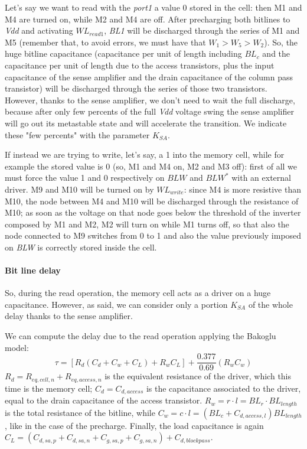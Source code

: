 Let's say we want to read with the \textit{port1} a value 0 stored in the cell: then M1 and M4 are turned on, while M2 and M4 are off. After precharging both bitlines to \textit{Vdd} and activating $WL_{read1}$, \textit{BL1} will be discharged through the series of M1 and M5 (remember that, to avoid errors, we must have that $W_1>W_5>W_2$). So, the huge bitline capacitance (capacitance per unit of length including $BL_c$ and the capacitance per unit of length due to the access transistors, plus the input capacitance of the sense amplifier and the drain capacitance of the column pass transistor) will be discharged through the series of those two transistors. However, thanks to the sense amplifier, we don't need to wait the full discharge, because after only few percents of the full \textit{Vdd} voltage swing the sense amplifier will go out its metastable state and will accelerate the transition. We indicate these "few percents" with the parameter $K_{SA}$. 

If instead we are trying to write, let's say, a 1 into the memory cell, while for example the stored value is 0 (so, M1 and M4 on, M2 and M3 off): first of all we must force the value 1 and 0 respectively on $BLW$ and $BLW^*$ with an external driver. M9 and M10 will be turned on by $WL_{write}$: since M4 is more resistive than M10, the node between M4 and M10 will be discharged through the resistance of M10; as soon as the voltage on that node goes below the threshold of the inverter composed by M1 and M2, M2 will turn on while M1 turns off, so that also the node connected to M9 switches from 0 to 1 and also the value previously imposed on \textit{BLW} is correctly stored inside the cell. 

\paragraph{Bit line delay} 
\label{sec:bitline_delay}
So, during the read operation, the memory cell acts as a driver on a huge capacitance. However, as said, we can consider only a portion $K_{SA}$ of the whole delay thanks to the sense amplifier. 

We can compute the delay due to the read operation applying the Bakoglu model:
$$\tau=[R_d(C_d+C_w+C_L)+R_wC_L]+\frac{0.377}{0.69}(R_wC_w)$$
$R_d=R_{eq,cell,n}+R_{eq,access,n}$ is the equivalent resistance of the driver, which this time is the memory cell; $C_d=C_{d,access}$ is the capacitance associated to the driver, equal to the drain capacitance of the access transistor. $R_w=r\cdot l=BL_{r}\cdot BL_{length}$ is the total resistance of the bitline, while $C_w=c\cdot l=(BL_{c}+C_{d,access,l})BL_{length}$, like in the case of the precharge. Finally, the load capacitance is again $C_L=(C_{d,sa,p}+C_{d,sa,n}+C_{g,sa,p}+C_{g,sa,n})+C_{d,blockpass}$.

